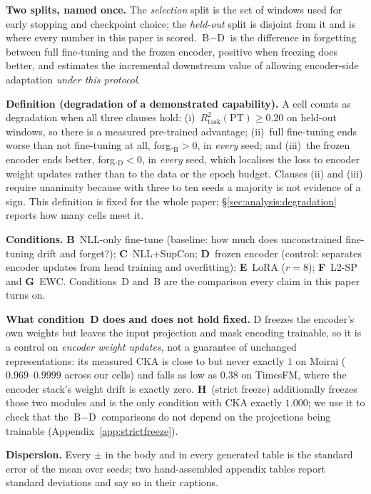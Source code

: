 \textbf{Two splits, named once.} The \emph{selection} split is the set of
windows used for early stopping and checkpoint choice; the \emph{held-out} split
is disjoint from it and is where every number in this paper is scored.
$\text{B}{-}\text{D}$ is the difference in forgetting between full fine-tuning
and the frozen encoder, positive when freezing does better, and estimates the
incremental downstream value of allowing encoder-side adaptation \emph{under
this protocol}.

\textbf{Definition (degradation of a demonstrated capability).} A cell counts as
degradation when all three clauses hold: (i)~$R^2_\text{task}(\text{PT}) \ge
0.20$ on held-out windows, so there is a measured pre-trained advantage;
(ii)~full fine-tuning ends worse than not fine-tuning at all, forg.$_\text{B} >
0$, in \emph{every} seed; and (iii)~the frozen encoder ends better,
forg.$_\text{D} < 0$, in \emph{every} seed, which localises the loss to encoder
weight updates rather than to the data or the epoch budget. Clauses (ii) and
(iii) require unanimity because with three to ten seeds a majority is not
evidence of a sign. This definition is fixed for the whole paper;
\S\ref{sec:analysis:degradation} reports how many cells meet it.

\textbf{Conditions.} \textbf{B}~NLL-only fine-tune (baseline: how much does
unconstrained fine-tuning drift and forget?); \textbf{C}~NLL$+$SupCon;
\textbf{D}~frozen encoder (control: separates encoder updates from head
training and overfitting); \textbf{E}~LoRA ($r{=}8$); \textbf{F}~L2-SP and
\textbf{G}~EWC. Conditions~D and~B are the comparison every claim in this
paper turns on.

\textbf{What condition~D does and does not hold fixed.} D freezes the
encoder's own weights but leaves the input projection and mask encoding
trainable, so it is a control on \emph{encoder weight updates}, not a
guarantee of unchanged representations: its measured CKA is close to but never
exactly $1$ on Moirai ($0.969$--$0.9999$ across our cells) and falls as low as
$0.38$ on TimesFM, where the encoder stack's weight drift is exactly zero.
\textbf{H}~(strict freeze) additionally freezes those two modules and is the
only condition with CKA exactly $1.000$; we use it to check that the
$\text{B}{-}\text{D}$ comparisons do not depend on the projections being
trainable (Appendix~\ref{app:strictfreeze}).

\textbf{Dispersion.} Every ${\pm}$ in the body and in every generated table is
the standard error of the mean over seeds; two hand-assembled appendix tables
report standard deviations and say so in their captions.
